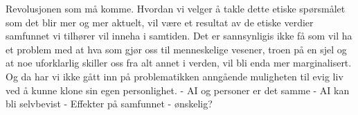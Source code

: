 Revolusjonen som må komme. 
Hvordan vi velger å takle dette etiske spørsmålet som det blir mer og mer aktuelt, vil være et resultat av de etiske verdier samfunnet vi tilhører vil inneha i samtiden. Det er sannsynligis ikke få som vil ha et problem med at hva som gjør oss til menneskelige vesener, troen på en sjel og at noe uforklarlig skiller oss fra alt annet i verden, vil bli enda mer marginalisert. Og da har vi ikke gått inn på problematikken anngående muligheten til evig liv ved å kunne klone sin egen personlighet. 
- AI og personer er det samme
- AI kan bli selvbevist
- Effekter på samfunnet
- ønskelig?
